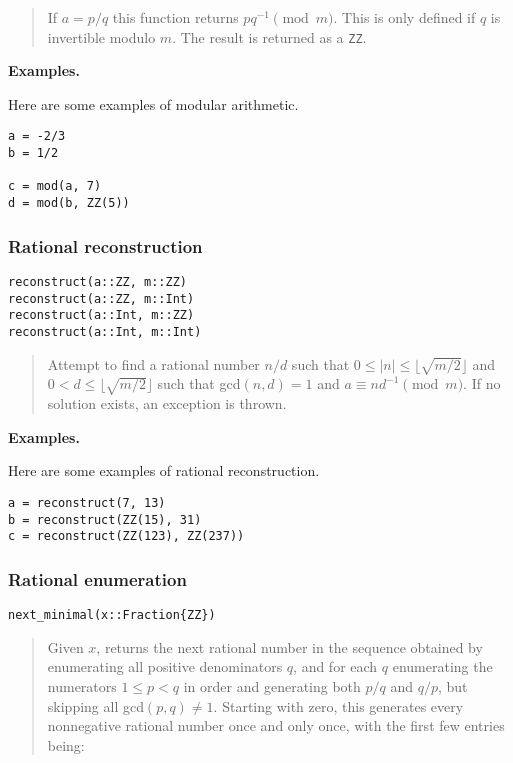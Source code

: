 \documentclass[a4paper,10pt]{article}
\newcommand{\code}{\lstinline}
\newcommand{\desc}[1]{\vspace{-3mm}\begin{quote}#1\end{quote}}
\begin{document}
{{{\desc{If $a = p/q$ this function returns $pq^{-1} \pmod{m}$. This is only
defined if $q$ is invertible modulo $m$. The result is returned as a \code{ZZ}.}

\textbf{Examples.}

Here are some examples of modular arithmetic.

\begin{lstlisting}
a = -2/3
b = 1/2

c = mod(a, 7)
d = mod(b, ZZ(5))
\end{lstlisting}

\subsubsection{Rational reconstruction}

\begin{lstlisting}
reconstruct(a::ZZ, m::ZZ)
reconstruct(a::ZZ, m::Int)
reconstruct(a::Int, m::ZZ)
reconstruct(a::Int, m::Int)
\end{lstlisting}

\desc{Attempt to find a rational number $n/d$ such that 
$0 \leq |n| \leq \lfloor\sqrt{m/2}\rfloor$ and 
$0 < d \leq \lfloor\sqrt{m/2}\rfloor$ such that gcd$(n, d) = 1$ and
$a \equiv nd^{-1} \pmod{m}$. If no solution exists, an exception is thrown.}

\textbf{Examples.}

Here are some examples of rational reconstruction.

\begin{lstlisting}
a = reconstruct(7, 13)
b = reconstruct(ZZ(15), 31)
c = reconstruct(ZZ(123), ZZ(237))
\end{lstlisting}

\subsubsection{Rational enumeration}

\begin{lstlisting}
next_minimal(x::Fraction{ZZ})
\end{lstlisting}

\desc{Given $x$, returns the next rational number in the sequence obtained by
enumerating all positive denominators $q$, and for each $q$ enumerating
the numerators $1 \le p < q$ in order and generating both $p/q$ and $q/p$,
but skipping all gcd$(p,q) \neq 1$. Starting with zero, this generates
every nonnegative rational number once and only once, with the first
few entries being:

}}}}
\end{document}
